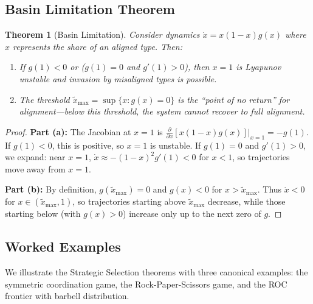 \documentclass[12pt]{article}
\newtheorem{theorem}{Theorem}[section]
\begin{document}
\subsection{Basin Limitation Theorem}

\begin{theorem}[Basin Limitation]
\label{thm:basin}
Consider dynamics $\dot{x} = x(1-x)g(x)$ where $x$ represents the share of an aligned type. Then:
\begin{enumerate}
    \item[(a)] If $g(1) < 0$ or ($g(1) = 0$ and $g'(1) > 0$), then $x = 1$ is Lyapunov unstable and invasion by misaligned types is possible.
    
    \item[(b)] The threshold $\tilde{x}_{\max} = \sup\{x : g(x) = 0\}$ is the ``point of no return'' for alignment---below this threshold, the system cannot recover to full alignment.
\end{enumerate}
\end{theorem}

\begin{proof}
\textbf{Part (a):} The Jacobian at $x = 1$ is $\frac{\partial}{\partial x}[x(1-x)g(x)]|_{x=1} = -g(1)$. If $g(1) < 0$, this is positive, so $x = 1$ is unstable. If $g(1) = 0$ and $g'(1) > 0$, we expand: near $x = 1$, $\dot{x} \approx -(1-x)^2 g'(1) < 0$ for $x < 1$, so trajectories move away from $x = 1$.

\textbf{Part (b):} By definition, $g(\tilde{x}_{\max}) = 0$ and $g(x) < 0$ for $x > \tilde{x}_{\max}$. Thus $\dot{x} < 0$ for $x \in (\tilde{x}_{\max}, 1)$, so trajectories starting above $\tilde{x}_{\max}$ decrease, while those starting below (with $g(x) > 0$) increase only up to the next zero of $g$.
\end{proof}


\subsection{Worked Examples}

We illustrate the Strategic Selection theorems with three canonical examples: the symmetric coordination game, the Rock-Paper-Scissors game, and the ROC frontier with barbell distribution.
\end{document}
